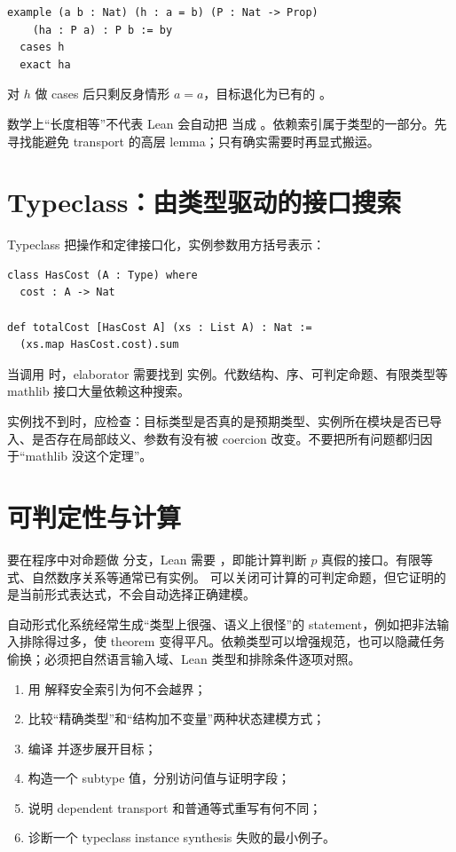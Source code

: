\begin{lstlisting}
example (a b : Nat) (h : a = b) (P : Nat -> Prop)
    (ha : P a) : P b := by
  cases h
  exact ha
\end{lstlisting}
对 $h$ 做 cases 后只剩反身情形 $a=a$，目标退化为已有的 。

\begin{warningbox}
数学上“长度相等”不代表 Lean 会自动把  当成 。依赖索引属于类型的一部分。先寻找能避免 transport 的高层 lemma；只有确实需要时再显式搬运。
\end{warningbox}

\section{Typeclass：由类型驱动的接口搜索}

Typeclass 把操作和定律接口化，实例参数用方括号表示：
\begin{lstlisting}
class HasCost (A : Type) where
  cost : A -> Nat

def totalCost [HasCost A] (xs : List A) : Nat :=
  (xs.map HasCost.cost).sum
\end{lstlisting}
当调用  时，elaborator 需要找到  实例。代数结构、序、可判定命题、有限类型等 mathlib 接口大量依赖这种搜索。

实例找不到时，应检查：目标类型是否真的是预期类型、实例所在模块是否已导入、是否存在局部歧义、参数有没有被 coercion 改变。不要把所有问题都归因于“mathlib 没这个定理”。

\section{可判定性与计算}

要在程序中对命题做  分支，Lean 需要 ，即能计算判断 $p$ 真假的接口。有限等式、自然数序关系等通常已有实例。 可以关闭可计算的可判定命题，但它证明的是当前形式表达式，不会自动选择正确建模。

\begin{aibox}
自动形式化系统经常生成“类型上很强、语义上很怪”的 statement，例如把非法输入排除得过多，使 theorem 变得平凡。依赖类型可以增强规范，也可以隐藏任务偷换；必须把自然语言输入域、Lean 类型和排除条件逐项对照。
\end{aibox}

\begin{checkpointbox}
\begin{enumerate}
  \item 用  解释安全索引为何不会越界；
  \item 比较“精确类型”和“结构加不变量”两种状态建模方式；
  \item 编译  并逐步展开目标；
  \item 构造一个 subtype 值，分别访问值与证明字段；
  \item 说明 dependent transport 和普通等式重写有何不同；
  \item 诊断一个 typeclass instance synthesis 失败的最小例子。
\end{enumerate}
\end{checkpointbox}
